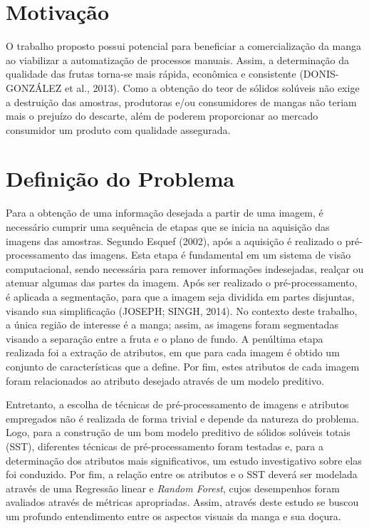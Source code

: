 \section{Motivação}

O trabalho proposto possui potencial para beneficiar a comercialização da manga ao viabilizar a automatização de processos manuais. Assim, a determinação da qualidade das frutas torna-se mais rápida, econômica e consistente (DONIS-GONZÁLEZ et al., 2013). Como a obtenção do teor de sólidos solúveis não exige a destruição das amostras, produtoras e/ou consumidores de mangas não teriam mais o prejuízo do descarte, além de poderem proporcionar ao mercado consumidor um produto com qualidade assegurada. 

\section{Definição do Problema}

Para a obtenção de uma informação desejada a partir de uma imagem, é necessário cumprir uma sequência de etapas que se inicia na aquisição das imagens das amostras. Segundo Esquef (2002), após a aquisição é realizado o pré-processamento das imagens. Esta etapa é 	fundamental em um sistema de visão computacional, sendo necessária para remover informações indesejadas, realçar ou atenuar algumas das partes da imagem. Após ser realizado o pré-processamento, é aplicada a segmentação, para que a imagem seja dividida em partes disjuntas, visando sua simplificação (JOSEPH; SINGH, 2014). No contexto deste trabalho, a única região de interesse é a manga; assim, as imagens foram segmentadas visando a separação entre a fruta e o plano de fundo. A penúltima etapa realizada foi a extração de atributos, em que para cada imagem é obtido um conjunto de características que a define. Por fim, estes atributos de cada imagem foram relacionados ao atributo desejado através de um modelo preditivo.

Entretanto, a escolha de técnicas de pré-processamento de imagens e atributos empregados não é realizada de forma trivial e depende da natureza do problema. Logo, para a construção de um bom modelo preditivo de sólidos solúveis totais (SST), diferentes técnicas de pré-processamento foram testadas e, para a determinação dos atributos mais significativos, um estudo investigativo sobre elas foi conduzido. Por fim, a relação entre os atributos e o SST deverá ser modelada através de uma Regressão linear e \textit{Random Forest}, cujos desempenhos foram avaliados através de métricas apropriadas. Assim, através deste estudo se buscou um profundo entendimento entre os aspectos visuais da manga e sua doçura. 

